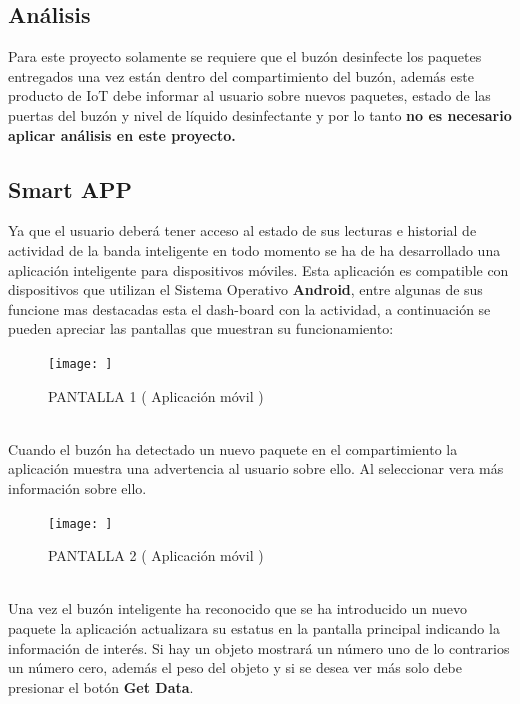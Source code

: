 \documentclass[osajnl,twocolumn,showpacs,superscriptaddress,10pt]{revtex4-1}
\begin{document}
\subsection{Análisis}
    Para este proyecto solamente se requiere que el buzón desinfecte los paquetes entregados una vez están dentro del compartimiento del buzón, además este producto de IoT debe informar al usuario sobre nuevos paquetes, estado de las puertas del buzón y nivel de líquido desinfectante y por lo tanto \textbf{no es necesario aplicar análisis en este proyecto.}
\subsection{Smart APP}
    Ya que el usuario deberá tener acceso al estado de sus lecturas e historial de actividad de la banda inteligente en todo momento se ha de ha desarrollado una aplicación inteligente para dispositivos móviles. Esta aplicación es compatible con dispositivos que utilizan el Sistema Operativo \textbf{Android}, entre algunas de sus funcione mas destacadas esta el dash-board con la actividad, a continuación se pueden apreciar las pantallas que muestran su funcionamiento:
    
\begin{figure} [H] \centering 
\caption{PANTALLA 1 ( Aplicación móvil )}
\texttt{[image: ]} 
\end{figure}
\\
Cuando el buzón ha detectado un nuevo paquete en el compartimiento la aplicación muestra una advertencia al usuario sobre ello. Al seleccionar vera más información sobre ello.

\begin{figure} [H] \centering 
\caption{PANTALLA 2 ( Aplicación móvil )}
\texttt{[image: ]} 
\end{figure}
\\
Una vez el buzón inteligente ha reconocido que se ha introducido un nuevo paquete la aplicación actualizara su estatus en la pantalla principal indicando la información de interés. Si hay un objeto mostrará un número uno de lo contrarios un número cero, además el peso del objeto y si se desea ver más solo debe presionar el botón \textbf{Get Data}.
\end{document}

